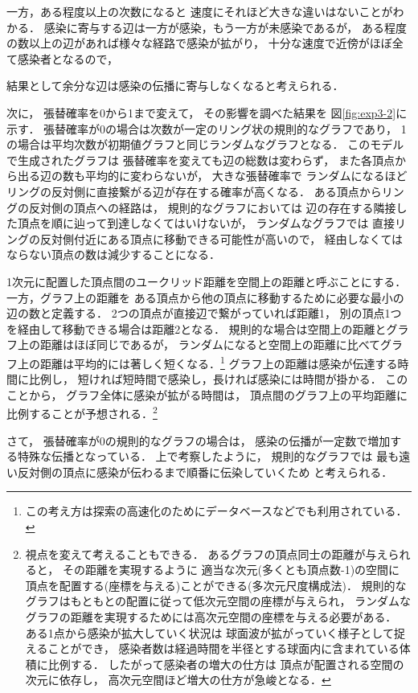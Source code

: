 \documentclass[10pt,oneside,fleqn]{scrartcl}
\begin{document}
一方，ある程度以上の次数になると
速度にそれほど大きな違いはないことがわかる．
感染に寄与する辺は一方が感染，もう一方が未感染であるが，
ある程度の数以上の辺があれば様々な経路で感染が拡がり，
十分な速度で近傍がほぼ全て感染者となるので，

結果として余分な辺は感染の伝播に寄与しなくなると考えられる．

次に，
張替確率を0から1まで変えて，
その影響を調べた結果を
図\ref{fig:exp3-2}に示す．
張替確率が0の場合は次数が一定のリング状の規則的なグラフであり，
1の場合は平均次数が初期値グラフと同じランダムなグラフとなる．
このモデルで生成されたグラフは
張替確率を変えても辺の総数は変わらず，
また各頂点から出る辺の数も平均的に変わらないが，
大きな張替確率で
ランダムになるほどリングの反対側に直接繋がる辺が存在する確率が高くなる．
ある頂点からリングの反対側の頂点への経路は，
規則的なグラフにおいては
辺の存在する隣接した頂点を順に辿って到達しなくてはいけないが，
ランダムなグラフでは
直接リングの反対側付近にある頂点に移動できる可能性が高いので，
経由しなくてはならない頂点の数は減少することになる．

1次元に配置した頂点間のユークリッド距離を空間上の距離と呼ぶことにする．
一方，グラフ上の距離を
ある頂点から他の頂点に移動するために必要な最小の辺の数と定義する．
2つの頂点が直接辺で繋がっていれば距離1，
別の頂点1つを経由して移動できる場合は距離2となる．
規則的な場合は空間上の距離とグラフ上の距離はほぼ同じであるが，
ランダムになると空間上の距離に比べてグラフ上の距離は平均的には著しく短くなる．\footnote{この考え方は探索の高速化のためにデータベースなどでも利用されている．}
グラフ上の距離は感染が伝達する時間に比例し，
短ければ短時間で感染し，長ければ感染には時間が掛かる．
このことから，
グラフ全体に感染が拡がる時間は，
頂点間のグラフ上の平均距離に比例することが予想される．\footnote{視点を変えて考えることもできる．
あるグラフの頂点同士の距離が与えられると，
その距離を実現するように
適当な次元(多くとも頂点数-1)の空間に
頂点を配置する(座標を与える)ことができる(多次元尺度構成法)．
規則的なグラフはもともとの配置に従って低次元空間の座標が与えられ，
ランダムなグラフの距離を実現するためには高次元空間の座標を与える必要がある．
ある1点から感染が拡大していく状況は
球面波が拡がっていく様子として捉えることができ，
感染者数は経過時間を半径とする球面内に含まれている体積に比例する．
したがって感染者の増大の仕方は
頂点が配置される空間の次元に依存し，
高次元空間ほど増大の仕方が急峻となる．}

さて，
張替確率が0の規則的なグラフの場合は，
感染の伝播が一定数で増加する特殊な伝播となっている．
上で考察したように，
規則的なグラフでは
最も遠い反対側の頂点に感染が伝わるまで順番に伝染していくため
と考えられる．
\end{document}
